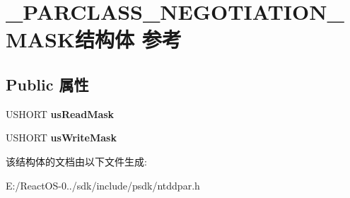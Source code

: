 \hypertarget{struct___p_a_r_c_l_a_s_s___n_e_g_o_t_i_a_t_i_o_n___m_a_s_k}{}\section{\+\_\+\+P\+A\+R\+C\+L\+A\+S\+S\+\_\+\+N\+E\+G\+O\+T\+I\+A\+T\+I\+O\+N\+\_\+\+M\+A\+S\+K结构体 参考}
\label{struct___p_a_r_c_l_a_s_s___n_e_g_o_t_i_a_t_i_o_n___m_a_s_k}
\subsection*{Public 属性}
\begin{DoxyCompactItemize}
\item 
\mbox{\label{struct___p_a_r_c_l_a_s_s___n_e_g_o_t_i_a_t_i_o_n___m_a_s_k_a07c32ab736c29db108b76e4b03184785}} 
U\+S\+H\+O\+RT {\bfseries us\+Read\+Mask}
\item 
\mbox{\label{struct___p_a_r_c_l_a_s_s___n_e_g_o_t_i_a_t_i_o_n___m_a_s_k_a82aaff1d3988b83a05b0423e6d9de8df}} 
U\+S\+H\+O\+RT {\bfseries us\+Write\+Mask}
\end{DoxyCompactItemize}


该结构体的文档由以下文件生成\+:\begin{DoxyCompactItemize}
\item 
E\+:/\+React\+O\+S-\/0../sdk/include/psdk/ntddpar.\+h\end{DoxyCompactItemize}

